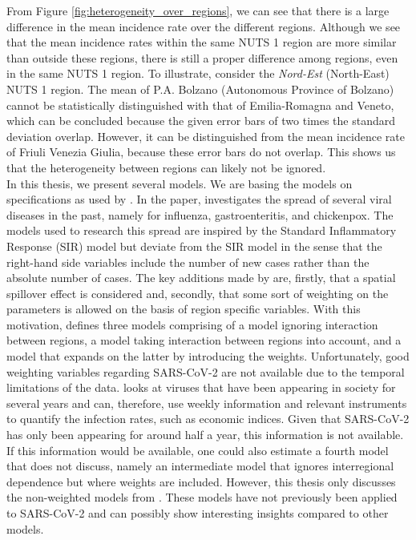 \documentclass[12pt]{article}
\begin{document}
	From Figure \ref{fig:heterogeneity_over_regions}, we can see that there is a large difference in the mean incidence rate over the different regions. Although we see that the mean incidence rates within the same NUTS 1 region are more similar than outside these regions, there is still a proper difference among regions, even in the same NUTS 1 region. To illustrate, consider the \textit{Nord-Est} (North-East) NUTS 1 region. The mean of P.A. Bolzano (Autonomous Province of Bolzano) cannot be statistically distinguished with that of Emilia-Romagna and Veneto, which can be concluded because the given error bars of two times the standard deviation overlap. However, it can be distinguished from the mean incidence rate of Friuli Venezia Giulia, because these error bars do not overlap. This shows us that the heterogeneity between regions can likely not be ignored. \\
	
	In this thesis, we present several models. We are basing the models on specifications as used by \textcite{adda2016economic}. In the paper, \textcite{adda2016economic} investigates the spread of several viral diseases in the past, namely for influenza, gastroenteritis, and chickenpox. The models used to research this spread are inspired by the Standard Inflammatory Response (SIR) model but deviate from the SIR model in the sense that the right-hand side variables include the number of new cases rather than the absolute number of cases. The key additions made by \textcite{adda2016economic} are, firstly, that a spatial spillover effect is considered and, secondly, that some sort of weighting on the parameters is allowed on the basis of region specific variables. With this motivation, \textcite{adda2016economic} defines three models comprising of a model ignoring interaction between regions, a model taking interaction between regions into account, and a model that expands on the latter by introducing the weights. Unfortunately, good weighting variables regarding SARS-CoV-2 are not available due to the temporal limitations of the data. \textcite{adda2016economic} looks at viruses that have been appearing in society for several years and can, therefore, use weekly information and relevant instruments to quantify the infection rates, such as economic indices. Given that SARS-CoV-2 has only been appearing for around half a year, this information is not available. If this information would be available, one could also estimate a fourth model that \textcite{adda2016economic} does not discuss, namely an intermediate model that ignores interregional dependence but where weights are included. However, this thesis only discusses the non-weighted models from \textcite{adda2016economic}. These models have not previously been applied to SARS-CoV-2 and can possibly show interesting insights compared to other models.
	
\end{document}
